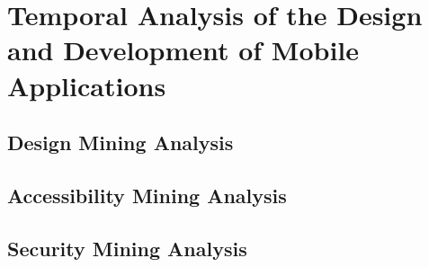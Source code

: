 \chapter{Temporal Analysis of the Design and Development of Mobile Applications}
\label{ch:findings_chapter}

\section{Design Mining Analysis}

\section{Accessibility Mining Analysis}

\section{Security Mining Analysis}
